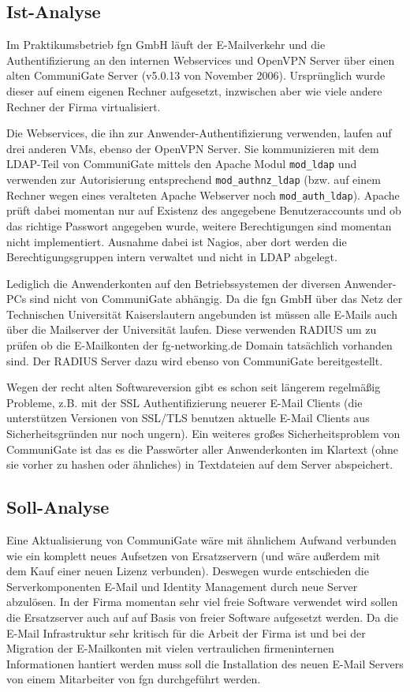 \documentclass[11pt,a4paper,titlepage=firstiscover]{scrartcl} %
\begin{document}
\subsection{Ist-Analyse}
Im Praktikumsbetrieb fgn GmbH läuft der E-Mailverkehr und die Authentifizierung an den internen Webservices und OpenVPN Server über einen alten CommuniGate Server (v5.0.13 von November 2006). Ursprünglich wurde dieser auf einem eigenen Rechner aufgesetzt, inzwischen aber wie viele andere Rechner der Firma virtualisiert. 

Die Webservices, die ihn zur Anwender-Authentifizierung verwenden, laufen auf drei anderen VMs, ebenso der OpenVPN Server. Sie kommunizieren mit dem LDAP-Teil von CommuniGate mittels den Apache Modul \texttt{mod\_ldap} und verwenden zur Autorisierung entsprechend \texttt{mod\_authnz\_ldap} (bzw. auf einem Rechner wegen eines veralteten Apache Webserver noch \texttt{mod\_auth\_ldap}). Apache prüft dabei momentan nur auf Existenz des angegebene Benutzeraccounts und ob das richtige Passwort angegeben wurde, weitere Berechtigungen sind momentan nicht implementiert. Ausnahme dabei ist Nagios, aber dort werden die Berechtigungsgruppen intern verwaltet und nicht in LDAP abgelegt.

Lediglich die Anwenderkonten auf den Betriebssystemen der diversen Anwender-PCs sind nicht von CommuniGate abhängig. Da die fgn GmbH über das Netz der Technischen Universität Kaiserslautern angebunden ist müssen alle E-Mails auch über die Mailserver der Universität laufen. Diese verwenden RADIUS um zu prüfen ob die E-Mailkonten der fg-networking.de Domain tatsächlich vorhanden sind. Der RADIUS Server dazu wird ebenso von CommuniGate bereitgestellt. 

Wegen der recht alten Softwareversion gibt es schon seit längerem regelmäßig Probleme, z.B. mit der SSL Authentifizierung neuerer E-Mail Clients (die unterstützen Versionen von SSL/TLS benutzen aktuelle E-Mail Clients aus Sicherheitsgründen nur noch ungern). Ein weiteres großes Sicherheitsproblem von CommuniGate ist das es die Passwörter aller Anwenderkonten im Klartext (ohne sie vorher zu hashen oder ähnliches) in Textdateien auf dem Server abspeichert.

\subsection{Soll-Analyse}
Eine Aktualisierung von CommuniGate wäre mit ähnlichem Aufwand verbunden wie ein komplett neues Aufsetzen von Ersatzservern (und wäre außerdem mit dem Kauf einer neuen Lizenz verbunden). Deswegen wurde entschieden die Serverkomponenten E-Mail und Identity Management durch neue Server abzulösen. In der Firma momentan sehr viel freie Software verwendet wird sollen die Ersatzserver auch auf auf Basis von freier Software aufgesetzt werden. Da die E-Mail Infrastruktur sehr kritisch für die Arbeit der Firma ist und bei der Migration der E-Mailkonten mit vielen vertraulichen firmeninternen Informationen hantiert werden muss soll die Installation des neuen E-Mail Servers von einem Mitarbeiter von fgn durchgeführt werden.
\end{document}
